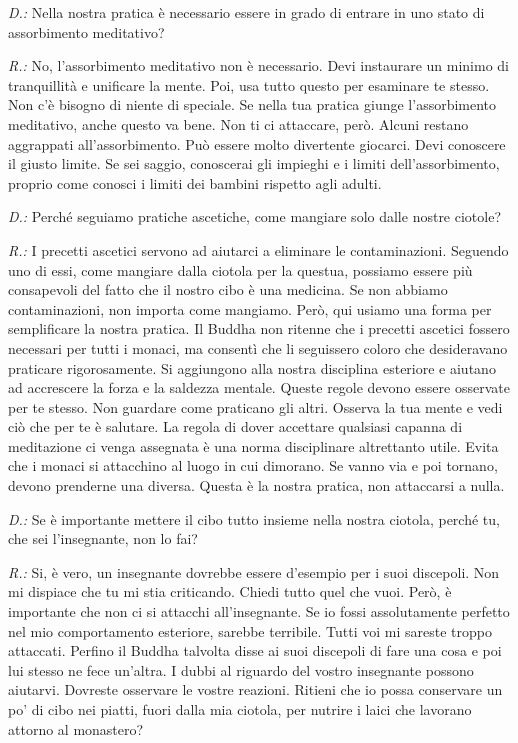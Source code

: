 \emph{D.:} Nella nostra pratica è necessario essere in grado di entrare in uno
stato di assorbimento meditativo?

\emph{R.:} No, l'assorbimento meditativo non è necessario. Devi instaurare un
minimo di tranquillità e unificare la mente. Poi, usa tutto questo per
esaminare te stesso. Non c'è bisogno di niente di speciale. Se nella tua
pratica giunge l'assorbimento meditativo, anche questo va bene. Non ti
ci attaccare, però. Alcuni restano aggrappati all'assorbimento. Può
essere molto divertente giocarci. Devi conoscere il giusto limite. Se
sei saggio, conoscerai gli impieghi e i limiti dell'assorbimento,
proprio come conosci i limiti dei bambini rispetto agli adulti.

\emph{D.:} Perché seguiamo pratiche ascetiche, come mangiare solo dalle nostre
ciotole?

\emph{R.:} I precetti ascetici servono ad aiutarci a eliminare le
contaminazioni. Seguendo uno di essi, come mangiare dalla ciotola per la
questua, possiamo essere più consapevoli del fatto che il nostro cibo è
una medicina. Se non abbiamo contaminazioni, non importa come mangiamo.
Però, qui usiamo una forma per semplificare la nostra pratica. Il Buddha
non ritenne che i precetti ascetici fossero necessari per tutti i
monaci, ma consentì che li seguissero coloro che desideravano praticare
rigorosamente. Si aggiungono alla nostra disciplina esteriore e aiutano
ad accrescere la forza e la saldezza mentale. Queste regole devono
essere osservate per te stesso. Non guardare come praticano gli altri.
Osserva la tua mente e vedi ciò che per te è salutare. La regola di
dover accettare qualsiasi capanna di meditazione ci venga assegnata è
una norma disciplinare altrettanto utile. Evita che i monaci si
attacchino al luogo in cui dimorano. Se vanno via e poi tornano, devono
prenderne una diversa. Questa è la nostra pratica, non attaccarsi a
nulla.

\emph{D.:} Se è importante mettere il cibo tutto insieme nella nostra ciotola,
perché tu, che sei l'insegnante, non lo fai?

\emph{R.:} Si, è vero, un insegnante dovrebbe essere d'esempio per i suoi
discepoli. Non mi dispiace che tu mi stia criticando. Chiedi tutto quel
che vuoi. Però, è importante che non ci si attacchi all'insegnante. Se
io fossi assolutamente perfetto nel mio comportamento esteriore, sarebbe
terribile. Tutti voi mi sareste troppo attaccati. Perfino il Buddha
talvolta disse ai suoi discepoli di fare una cosa e poi lui stesso ne
fece un'altra. I dubbi al riguardo del vostro insegnante possono
aiutarvi. Dovreste osservare le vostre reazioni. Ritieni che io possa
conservare un po' di cibo nei piatti, fuori dalla mia ciotola, per
nutrire i laici che lavorano attorno al monastero?

